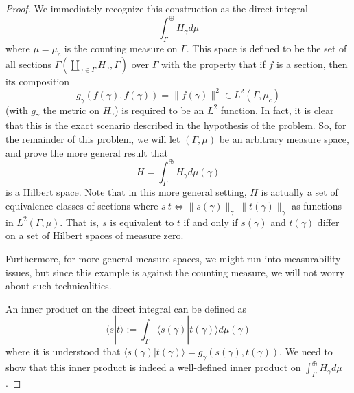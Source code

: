 \documentclass[fontsize=11pt]{scrartcl} %
\numberwithin{equation}{section} %
\numberwithin{figure}{section} %
\numberwithin{table}{section} %
\newcommand{\la}{\langle}
\newcommand{\ra}{\rangle}
\begin{document}
\begin{proof}
    We immediately recognize this construction as the direct integral
    \[
        \int_{\Gamma}^{\oplus}H_{\gamma}d\mu
    \]
    where $\mu=\mu_c$ is the counting measure on $\Gamma$. This space is defined
    to be the set of all sections
    $\Gamma(\coprod_{\gamma\in\Gamma}H_{\gamma},\Gamma)$ over $\Gamma$ with the
    property that if $f$ is a section, then its composition
    \[
        g_{\gamma}(f(\gamma),f(\gamma)) = \|f(\gamma)\|^2\in L^2(\Gamma,\mu_c)
    \]
    (with $g_{\gamma}$ the metric on $H_{\gamma}$)
    is required to be an $L^2$ function. In fact, it is clear that this is the
    exact scenario described in the hypothesis of the problem.
    So, for the remainder of this problem, we will let $(\Gamma,\mu)$ be an
    arbitrary measure space, and prove the more general result that
    \[
        H = \int_{\Gamma}^{\oplus}H_{\gamma}d\mu(\gamma)
    \]
    is a Hilbert space. Note that in this more general setting, $H$ is actually
    a set of equivalence classes of sections where $s~t \iff
    \|s(\gamma)\|_{\gamma} ~ \|t(\gamma)\|_{\gamma}$ as functions in
    $L^2(\Gamma,\mu)$.
    That is, $s$ is equivalent to $t$ if and only if $s(\gamma)$ and
    $t(\gamma)$ differ on a set of Hilbert spaces of measure zero.
    
    Furthermore, for more general measure spaces, we might run into
    measurability issues, but since this example is against the counting
    measure, we will not worry about such technicalities.

    An inner product on the direct integral can be defined as
    \[
        \la s|t\ra := \int_{\Gamma}\la s(\gamma)|t(\gamma)\ra d\mu(\gamma)
    \]
    where it is understood that $\la s(\gamma)|t(\gamma)\ra =
    g_{\gamma}(s(\gamma),t(\gamma))$.
    We need to show that this inner product is indeed a well-defined inner
    product on $\int_{\Gamma}^{\oplus}H_{\gamma}d\mu$.



\end{proof}
\end{document}
